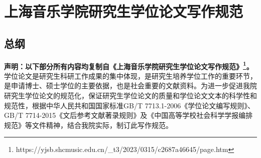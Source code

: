 
\part{上海音乐学院研究生学位论文写作规范}
\chapter{总纲}

\textbf{声明：以下部分所有内容均复制自《上海音乐学院研究生学位论文写作规范》\footnote{https://yjsb.shcmusic.edu.cn/\_t3/2023/0315/c2687a46645/page.htm}。}\\

学位论文是研究生科研工作成果的集中体现，是研究生培养学位工作的重要环节，是申请博士、硕士学位的主要依据，也是社会重要的文献资料。为进一步促进我院研究生学位论文的规范化，保证研究生学位论文的质量和学位论文文本的科学性和规范性，根据中华人民共和国国家标准GB/T 7713.1-2006《学位论文编写规则》、GB/T 7714-2015《文后参考文献著录规则》及《中国高等学校社会科学学报编排规范》等文件精神，结合我院实际，制订此写作规范。
